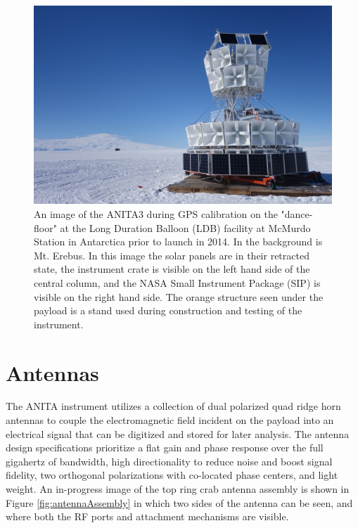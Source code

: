 \begin{figure}
\centering
	\includegraphics[width=\textwidth]{figures/ANITA3_dancefloor}
	\caption{An image of the ANITA3 during GPS calibration on the "dance-floor" at the Long Duration Balloon (LDB) facility at McMurdo Station in Antarctica prior to launch in 2014.  In the background is Mt. Erebus.  In this image the solar panels are in their retracted state, the instrument crate is visible on the left hand side of the central column, and the NASA Small Instrument Package (SIP) is visible on the right hand side. The orange structure seen under the payload is a stand used during construction and testing of the instrument.}
	\label{fig:ANITA3_dancefloor}
\end{figure}



	
\section{Antennas}
	The ANITA instrument utilizes a collection of dual polarized quad ridge horn antennas to couple the electromagnetic field incident on the payload into an electrical signal that can be digitized and stored for later analysis.  The antenna design specifications prioritize a flat gain and phase response over the full gigahertz of bandwidth, high directionality to reduce noise and boost signal fidelity, two orthogonal polarizations with co-located phase centers, and light weight. 	An in-progress image of the top ring crab antenna assembly is shown in Figure \ref{fig:antennaAssembly} in which two sides of the antenna can be seen, and where both the RF ports and attachment mechanisms are visible.
	
